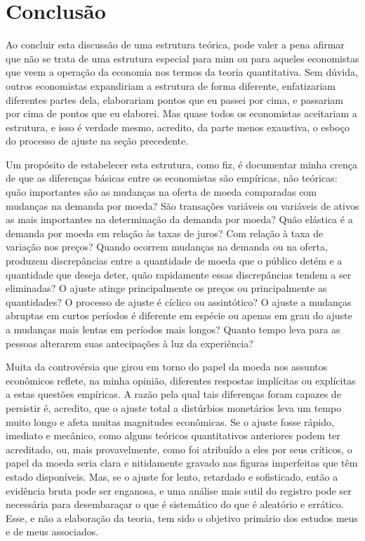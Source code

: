 \documentclass[12pt]{article}
\begin{document}
\section{Conclusão}

Ao concluir esta discussão de uma estrutura teórica, pode valer a pena afirmar que não se trata de uma estrutura especial para mim ou para aqueles economistas que veem a operação da economia nos termos da teoria quantitativa. Sem dúvida, outros economistas expandiriam a estrutura de forma diferente, enfatizariam diferentes partes dela, elaborariam pontos que eu passei por cima, e passariam por cima de pontos que eu elaborei. Mas quase todos os economistas aceitariam a estrutura, e isso é verdade mesmo, acredito, da parte menos exaustiva, o esboço do processo de ajuste na seção precedente.

Um propósito de estabelecer esta estrutura, como fiz, é documentar minha crença de que as diferenças básicas entre os economistas são empíricas, não teóricas: quão importantes são as mudanças na oferta de moeda comparadas com mudanças na demanda por moeda? São transações variáveis ou variáveis de ativos as mais importantes na determinação da demanda por moeda? Quão elástica é a demanda por moeda em relação às taxas de juros? Com relação à taxa de variação nos preços? Quando ocorrem mudanças na demanda ou na oferta, produzem discrepâncias entre a quantidade de moeda que o público detém e a quantidade que deseja deter, quão rapidamente essas discrepâncias tendem a ser eliminadas? O ajuste atinge principalmente os preços ou principalmente as quantidades? O processo de ajuste é cíclico ou assintótico? O ajuste a mudanças abruptas em curtos períodos é diferente em espécie ou apenas em grau do ajuste a mudanças mais lentas em períodos mais longos? Quanto tempo leva para as pessoas alterarem suas antecipações à luz da experiência?

Muita da controvérsia que girou em torno do papel da moeda nos assuntos econômicos reflete, na minha opinião, diferentes respostas implícitas ou explícitas a estas questões empíricas. A razão pela qual tais diferenças foram capazes de persistir é, acredito, que o ajuste total a distúrbios monetários leva um tempo muito longo e afeta muitas magnitudes econômicas. Se o ajuste fosse rápido, imediato e mecânico, como alguns teóricos quantitativos anteriores podem ter acreditado, ou, mais provavelmente, como foi atribuído a eles por seus críticos, o papel da moeda seria clara e nitidamente gravado nas figuras imperfeitas que têm estado disponíveis. Mas, se o ajuste for lento, retardado e sofisticado, então a evidência bruta pode ser enganosa, e uma análise mais sutil do registro pode ser necessária para desembaraçar o que é sistemático do que é aleatório e errático. Esse, e não a elaboração da teoria, tem sido o objetivo primário dos estudos meus e de meus associados.
\end{document}
